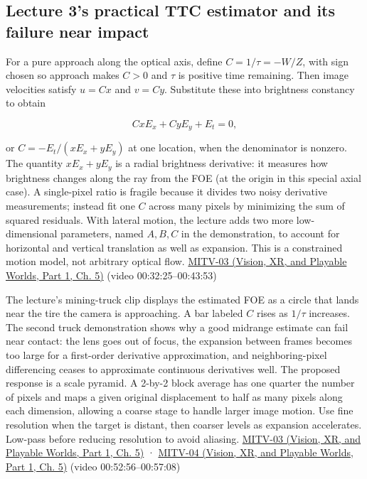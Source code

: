 \subsection{Lecture 3's practical TTC estimator and its failure near impact}\label{04-visual-computing-ii-ch030-lecture-3s-practical-ttc-estimator-and-its-failure-near-impact}

\hypertarget{04-visual-computing-ii-ch030-lecture-3s-practical-ttc-estimator-and-its-failure-near-impact}{}

For a pure approach along the optical axis, define \(C=1/\tau=-W/Z\), with sign chosen so approach makes \(C>0\) and \(\tau\) is positive time remaining. Then image velocities satisfy \(u=Cx\) and \(v=Cy\). Substitute these into brightness constancy to obtain

\[
CxE_x+CyE_y+E_t=0,
\]

or \(C=-E_t/(xE_x+yE_y)\) at one location, when the denominator is nonzero. The quantity \(xE_x+yE_y\) is a radial brightness derivative: it measures how brightness changes along the ray from the FOE (at the origin in this special axial case). A single-pixel ratio is fragile because it divides two noisy derivative measurements; instead fit one \(C\) across many pixels by minimizing the sum of squared residuals. With lateral motion, the lecture adds two more low-dimensional parameters, named \(A,B,C\) in the demonstration, to account for horizontal and vertical translation as well as expansion. This is a constrained motion model, not arbitrary optical flow. \href{../07-Vision-XR-and-Playable-Worlds-P01/main.pdf\#nameddest=04-visual-computing-ii-ch036-mitv-03---time-to-contact-focus-of-expansion-direct-motion-vision-methods-noise-gain}{MITV-03 (Vision, XR, and Playable Worlds, Part 1, Ch. 5)} (video 00:32:25--00:43:53)

The lecture's mining-truck clip displays the estimated FOE as a circle that lands near the tire the camera is approaching. A bar labeled \(C\) rises as \(1/\tau\) increases. The second truck demonstration shows why a good midrange estimate can fail near contact: the lens goes out of focus, the expansion between frames becomes too large for a first-order derivative approximation, and neighboring-pixel differencing ceases to approximate continuous derivatives well. The proposed response is a scale pyramid. A 2-by-2 block average has one quarter the number of pixels and maps a given original displacement to half as many pixels along each dimension, allowing a coarse stage to handle larger image motion. Use fine resolution when the target is distant, then coarser levels as expansion accelerates. Low-pass before reducing resolution to avoid aliasing. \href{../07-Vision-XR-and-Playable-Worlds-P01/main.pdf\#nameddest=04-visual-computing-ii-ch036-mitv-03---time-to-contact-focus-of-expansion-direct-motion-vision-methods-noise-gain}{MITV-03 (Vision, XR, and Playable Worlds, Part 1, Ch. 5)} · \href{../07-Vision-XR-and-Playable-Worlds-P01/main.pdf\#nameddest=04-visual-computing-ii-ch036-mitv-04---fixed-optical-flow-optical-mouse-constant-brightness-assumption-closed-form-solution}{MITV-04 (Vision, XR, and Playable Worlds, Part 1, Ch. 5)} (video 00:52:56--00:57:08)

